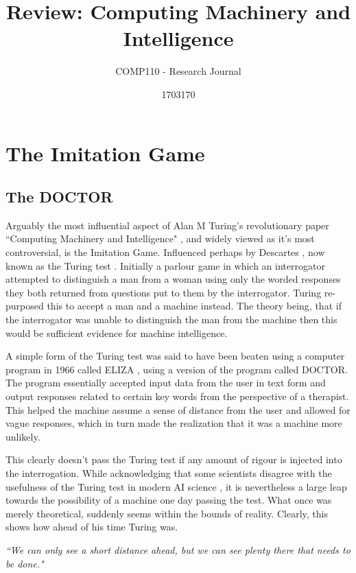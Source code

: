 \documentclass{scrartcl}
\title{Review: Computing Machinery and Intelligence
}
\subtitle{COMP110 - Research Journal}
\author{1703170}
\begin{document}
\maketitle

\section{The Imitation Game}

\subsection{The DOCTOR}

Arguably the most influential aspect of Alan M Turing's revolutionary paper \textquotedblleft Computing Machinery and Intelligence" \cite{turing1950computing:1}, and widely viewed as it's most controversial, is the Imitation Game. Influenced perhaps by Descartes \cite{descartes1996discourse:2}, now known as the Turing test \cite[p.17]{suchman1987plans:3}. Initially a parlour game in which an interrogator attempted to distinguish a man from a woman using only the worded responses they both returned from questions put to them by the interrogator. Turing re-purposed this to accept a man and a machine instead. The theory being, that if the interrogator was unable to distinguish the man from the machine then this would be sufficient evidence for machine intelligence.

A simple form of the Turing test was said to have been beaten using a computer program in 1966 called ELIZA \cite{weizenbaum1966eliza:4}, using a version of the program called DOCTOR. The program essentially accepted input data from the user in text form and output responses related to certain key words from the perspective of a therapist. This helped the machine assume a sense of distance from the user and allowed for vague responses, which in turn made the realization that it was a machine more unlikely.

This clearly doesn't pass the Turing test if any amount of rigour is injected into the interrogation. While acknowledging that some scientists disagree with the usefulness of the Turing test in modern AI science \cite{hayes1995turing:5}, it is nevertheless a large leap towards the possibility of a machine one day passing the test. What once was merely theoretical, suddenly seems within the bounds of reality. Clearly, this shows how ahead of his time Turing was.

\textit{\textquotedblleft We can only see a short distance ahead, but we can see plenty there that needs to be done."} 
\end{document}
